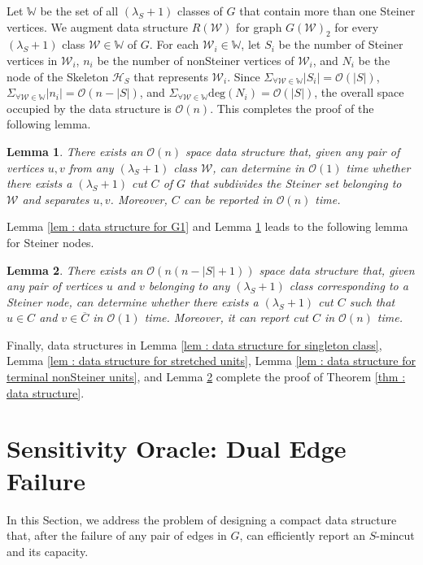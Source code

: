 \documentclass[letterpaper,11pt]{article}
\newtheorem{lemma}{Lemma}[]
\begin{document}
Let ${\mathbb W}$ be the set of all $(\lambda_S+1)$ classes of $G$ that contain more than one Steiner vertices. We augment data structure $R({\mathcal W})$ for graph $G({\mathcal W})_2$ for every $(\lambda_S+1)$ class ${\mathcal W}\in {\mathbb W}$ of $G$. For each ${\mathcal W}_i\in {\mathbb W}$, let $S_i$ be the number of Steiner vertices in ${\mathcal W}_i$, $n_i$ be the number of nonSteiner vertices of ${\mathcal W}_i$, and $N_i$ be the node of the Skeleton ${\mathcal H}_S$ that represents ${\mathcal W}_i$. Since $\Sigma_{\forall{\mathcal W}\in {\mathbb W}} |S_i|={\mathcal O}(|S|)$, $\Sigma_{\forall{\mathcal W}\in {\mathbb W}} |n_i|={\mathcal O}(n-|S|)$, and $\Sigma_{\forall{\mathcal W}\in {\mathbb W}} \text{deg}(N_i)={\mathcal O}(|S|)$, the overall space occupied by the data structure is ${\mathcal O}(n)$. This completes the proof of the following lemma. 
\begin{lemma} \label{lem : data structure for G2}
    There exists an ${\mathcal O}(n)$ space data structure that, given any pair of vertices $u,v$ from any $(\lambda_S+1)$ class ${\mathcal W}$, can determine in ${\mathcal O}(1)$ time whether there exists a $(\lambda_S+1)$ cut $C$ of $G$ that subdivides the Steiner set belonging to ${\mathcal W}$ and separates $u,v$. Moreover, $C$ can be reported in ${\mathcal O}(n)$ time. 
\end{lemma}
Lemma \ref{lem : data structure for G1} and Lemma \ref{lem : data structure for G2} leads to the following lemma for Steiner nodes.
\begin{lemma} \label{lem : data structure for generic steiner node}
       There exists an ${\mathcal O}(n(n-|S|+1))$ space data structure that, given any pair of vertices $u$ and $v$ belonging to any $(\lambda_S+1)$ class corresponding to a Steiner node, can determine whether there exists a $(\lambda_S+1)$ cut $C$ such that $u\in C$ and $v\in \overline{C}$ in ${\mathcal O}(1)$ time. Moreover, it can report cut $C$ in ${\mathcal O}(n)$ time.
\end{lemma}
Finally, data structures in Lemma \ref{lem : data structure for singleton class}, Lemma \ref{lem : data structure for stretched units}, Lemma \ref{lem : data structure for terminal nonSteiner units}, and Lemma \ref{lem : data structure for generic steiner node} complete the proof of Theorem \ref{thm : data structure}. 


\section{Sensitivity Oracle: Dual Edge Failure} \label{sec : dual edge oracle}
In this Section, we address the problem of designing a compact data structure that, after the failure of any pair of edges in $G$, can efficiently report an $S$-mincut and its capacity. 
\end{document}
